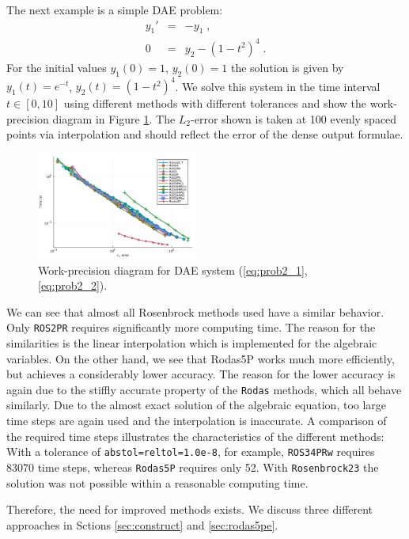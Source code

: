 \documentclass{juliacon}
\begin{document}
The next example is a simple DAE problem:
\begin{eqnarray}
y_1' &=& -y_1  \; ,\label{eq:prob2_1}\\
0 &=& y_2 -(1-t^2)^4 \; .\label{eq:prob2_2}
\end{eqnarray}
For the initial values $y_1(0)=1$, $y_2(0)=1$ the solution is given by 
$y_1(t)= e^{-t}$, $y_2(t)=(1-t^2)^4$. We solve this system in the time interval $t \in [0,10]$ 
using different methods with different tolerances and show the work-precision diagram in Figure \ref{fig:bench1}.
The $L_2$-error shown is taken at 100 evenly spaced points via interpolation and should reflect the error of the dense output formulae.
\begin{figure}[t]
 \centering
 \includegraphics[width=0.47\textwidth]{Abb_2.pdf}
 \caption{Work-precision diagram for DAE system (\ref{eq:prob2_1},\ref{eq:prob2_2}).}\label{fig:bench1}
\end{figure}
We can see that almost all Rosenbrock methods used have a similar behavior. Only \verb|ROS2PR| requires significantly more computing time.
The reason for the similarities is the linear interpolation which is implemented for the algebraic variables.
On the other hand, we see that Rodas5P works much more efficiently, but achieves a considerably lower accuracy. 
The reason for the lower accuracy is again due to the stiffly accurate property of the \verb|Rodas| methods, which all behave similarly. 
Due to the almost exact solution of the algebraic equation, too large time steps are again used and the interpolation is inaccurate.
A comparison of the required time steps illustrates the characteristics of the different methods: 
With a tolerance of \verb|abstol=reltol=1.0e-8|, for example, \verb|ROS34PRw| requires 83070 time steps, whereas \verb|Rodas5P| requires only 52.
With \verb|Rosenbrock23| the solution was not possible within a reasonable computing time.


Therefore, the need for improved methods exists. We discuss three different approaches in Sctions \ref{sec:construct} and \ref{sec:rodas5pe}.
\end{document}
